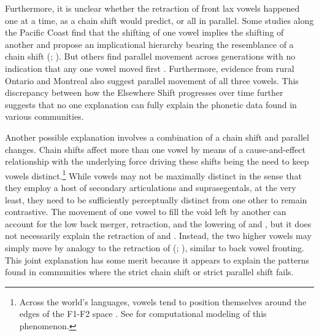 Furthermore, it is unclear whether the retraction of front lax vowels happened one at a time, as a chain shift would predict, or all in parallel. Some studies along the Pacific Coast find that the shifting of one vowel implies the shifting of another and propose an implicational hierarchy bearing the resemblance of a chain shift (\citealt[116--117]{becker_etal_2016_pads}; \citealt[121]{holland_2014_diss}). But others find parallel movement across generations with no indication that any one vowel moved first \citep{pratt_etal_2018, donofrio_etal_2019}. Furthermore, evidence from rural Ontario \citep{lawrance_2002_thesis} and Montreal \citep{boberg_2005} also suggest parallel movement of all three vowels. This discrepancy between how the Elsewhere Shift progresses over time further suggests that no one explanation can fully explain the phonetic data found in various communities.

Another possible explanation involves a combination of a chain shift and parallel changes. Chain shifts affect more than one vowel by means of a cause-and-effect relationship \citep[119--121]{labov_1994} with the underlying force driving these shifts being the need to keep vowels distinct.\footnote{Across the world's languages, vowels tend to position themselves around the edges of the F1-F2 space \citep[228,285]{ladefoged_johnson_2011}. See \citet{boer_2001} for computational modeling of this phenomenon.} While vowels may not be maximally distinct in the sense that they employ a host of secondary articulations and suprasegentals, at the very least, they need to be sufficiently perceptually distinct from one other to remain contrastive. The movement of one vowel to fill the void left by another can account for the low back merger, \trap retraction, and the lowering of \dress and \kit, but it does not necessarily explain the retraction of \dress and \kit. Instead, the two higher vowels may simply move by analogy to the retraction of \trap (\citealt[232]{durian_2012_diss}; \citealt[151]{boberg_2005}), similar to back vowel fronting. This joint explanation has some merit because it appears to explain the patterns found in communities where the strict chain shift or strict parallel shift fails.

